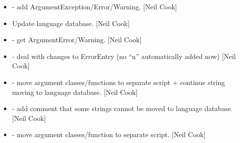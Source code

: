 \documentclass[a4paper,10pt,english]{report}
\begin{document}
\begin{itemize}
\item {} 
 - add ArgumentException/Error/Warning. {[}Neil Cook{]}

\item {} 
Update language database. {[}Neil Cook{]}

\item {} 
 - get ArgumentError/Warning. {[}Neil Cook{]}

\item {} 
 - deal with changes to ErrorEntry (no “n”
automatically added now) {[}Neil Cook{]}

\item {} 
 - move argument classes/functions to separate script +
continue string moving to language database. {[}Neil Cook{]}

\item {} 
 - add comment that some strings cannot be moved to language
database. {[}Neil Cook{]}

\item {} 
 - move argument classes/function to separate script.
{[}Neil Cook{]}

\end{itemize}
\end{document}
